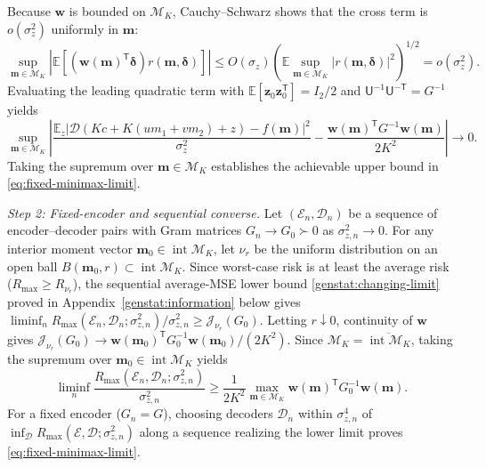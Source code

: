 \documentclass[journal,12pt,onecolumn,draftclsnofoot]{IEEEtran}
\newcommand{\enc}{\mathscr{E}}\newcommand{\dec}{\mathscr{D}}\newcommand{\R}{\mathbb R}\newcommand{\C}{\mathbb C}
\newcommand{\T}{\mathsf T}\newcommand{\suc}{\succeq}
\begin{document}
Because $\boldsymbol w$ is bounded on $\mathcal M_K$, Cauchy--Schwarz shows that the cross term is $o(\sigma_z^2)$ uniformly in $\boldsymbol m$:
$$
 \sup_{\boldsymbol m\in\mathcal M_K}\left|\mathbb E[
 (\boldsymbol w(\boldsymbol m)^\T\boldsymbol\delta)
 r(\boldsymbol m,\boldsymbol\delta)]\right|
 \le O(\sigma_z)\left(\mathbb E\sup_{\boldsymbol m\in\mathcal M_K}
 |r(\boldsymbol m,\boldsymbol\delta)|^2\right)^{1/2}
 =o(\sigma_z^2).
$$
Evaluating the leading quadratic term with $\mathbb E[\boldsymbol z_0\boldsymbol z_0^\T]=I_2/2$ and $\mathsf U^{-1}\mathsf U^{-\T}=G^{-1}$ yields
\begin{equation}
 \sup_{\boldsymbol m\in\mathcal M_K}
 \left|
 \frac{\mathbb E_z
 |\dec(Kc+K(um_1+vm_2)+z)
   -f(\boldsymbol m)|^2}{\sigma_z^2}
 -\frac{\boldsymbol w(\boldsymbol m)^\T
 G^{-1}\boldsymbol w(\boldsymbol m)}{2K^2}
 \right|\longrightarrow0.
\label{eq:uniform-gaussian-expansion}
\end{equation}
Taking the supremum over $\boldsymbol m\in\mathcal M_K$ establishes the achievable upper bound in \eqref{eq:fixed-minimax-limit}.

\emph{Step 2: Fixed-encoder and sequential converse.}
Let $(\enc_n,\dec_n)$ be a sequence of encoder--decoder pairs with Gram matrices $G_n\to G_0\succ0$ as $\sigma_{z,n}^2\to0$.
For any interior moment vector $\boldsymbol m_0\in\operatorname{int}\mathcal M_K$, let $\nu_r$ be the uniform distribution on an open ball $B(\boldsymbol m_0,r)\subset\operatorname{int}\mathcal M_K$. 
Since worst-case risk is at least the average risk ($R_{\max}\ge R_{\nu_r}$), the sequential average-MSE lower bound \eqref{genstat:changing-limit} proved in Appendix~\ref{genstat:information} below gives
$\liminf_n R_{\max}(\enc_n,\dec_n;\sigma_{z,n}^2)/\sigma_{z,n}^2\ge\mathcal J_{\nu_r}(G_0)$.
Letting $r\downarrow0$, continuity of $\boldsymbol w$ gives $\mathcal J_{\nu_r}(G_0)\to\boldsymbol w(\boldsymbol m_0)^\T G_0^{-1}\boldsymbol w(\boldsymbol m_0)/(2K^2)$.
Since $\mathcal M_K=\overline{\operatorname{int}\mathcal M_K}$, taking the supremum over $\boldsymbol m_0\in\operatorname{int}\mathcal M_K$ yields
\begin{equation}
 \liminf_n\frac{R_{\max}(\enc_n,\dec_n;\sigma_{z,n}^2)}{\sigma_{z,n}^2}
 \ge\frac{1}{2K^2}\max_{\boldsymbol m\in\mathcal M_K}
 \boldsymbol w(\boldsymbol m)^\T G_0^{-1}\boldsymbol w(\boldsymbol m).
 \label{eq:localized-minimax-converse}
\end{equation}
For a fixed encoder ($G_n=G$), choosing decoders $\dec_n$ within $\sigma_{z,n}^4$ of $\inf_\dec R_{\max}(\enc,\dec;\sigma_{z,n}^2)$ along a sequence realizing the lower limit proves \eqref{eq:fixed-minimax-limit}.
\end{document}
